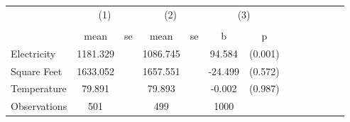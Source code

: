 {
\def\sym#1{\ifmmode^{#1}\else\(^{#1}\)\fi}
\begin{tabular}{l*{3}{cccc}}
\hline\hline
                    &\multicolumn{2}{c}{(1)}  &\multicolumn{2}{c}{(2)}  &\multicolumn{2}{c}{(3)}  \\
                    &\multicolumn{2}{c}{}     &\multicolumn{2}{c}{}     &\multicolumn{2}{c}{}     \\
                    &        mean&          se&        mean&          se&           b&           p\\
\hline
Electricity         &    1181.329&            &    1086.745&            &      94.584&     (0.001)\\
Square Feet         &    1633.052&            &    1657.551&            &     -24.499&     (0.572)\\
Temperature         &      79.891&            &      79.893&            &      -0.002&     (0.987)\\
\hline
Observations        &         501&            &         499&            &        1000&            \\
\hline\hline
\end{tabular}
}
